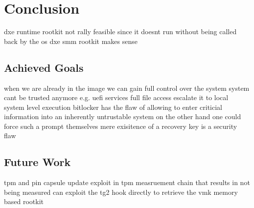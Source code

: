 
\chapter{Conclusion}

dxe runtime rootkit not rally feasible since it doesnt run without being called back by the os
dxe smm rootkit makes sense

\section{Achieved Goals}
when we are already in the image we can gain full control over the system
system cant be trusted anymore e.g. uefi services
full file access
escalate it to local system level execution
bitlocker has the flaw of allowing to enter criticial information into an inherently untrustable system
on the other hand one could force such a prompt themselves
mere exisitence of a recovery key is a security flaw

\section{Future Work}
tpm and pin
capsule update
exploit in tpm measruement chain that results in not being measured
can exploit the tg2 hook directly to retrieve the vmk
memory based rootkit